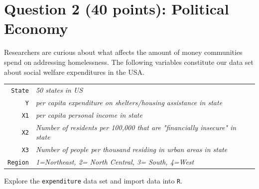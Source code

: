 \documentclass[12pt,letterpaper]{article}
\begin{document}
\newpage

	\section*{Question 2 (40 points): Political Economy}

\noindent Researchers are curious about what affects the amount of money communities spend on addressing homelessness. The following variables constitute our data set about social welfare expenditures in the USA. \\

\begin{tabular}{r|l}
	\texttt{State} &\emph{50 states in US} \\
	\texttt{Y} & \emph{per capita expenditure on shelters/housing assistance in state}\\
	\texttt{X1} &\emph{per capita personal income in state} \\
	\texttt{X2} &  \emph{Number of residents per 100,000 that are "financially insecure" in state}\\
	\texttt{X3} &  \emph{Number of people per thousand residing in urban areas in state} \\
	\texttt{Region} &  \emph{1=Northeast, 2= North Central, 3= South, 4=West} \\
\end{tabular}

\vspace{.5cm}
\noindent Explore the \texttt{expenditure} data set and import data into \texttt{R}.
\vspace{.5cm}
  
\end{document}
